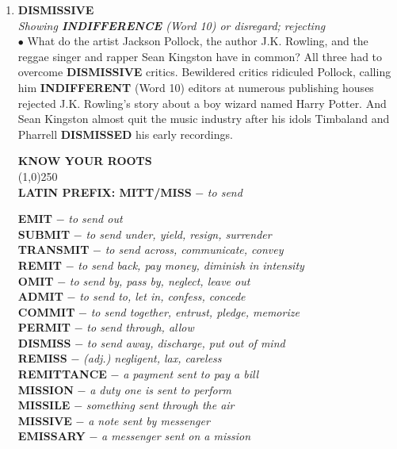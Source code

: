 \documentclass{book}
\begin{document}
\begin{enumerate}
 \item \textbf{DISMISSIVE}\\
 \textit{ Showing \textbf{INDIFFERENCE} (Word 10) or disregard; rejecting}\\
 
 $\bullet$ What do the artist Jackson Pollock, the author J.K. Rowling, and the reggae singer and rapper Sean Kingston have in common? All three had to overcome \textbf{DISMISSIVE} critics. Bewildered critics ridiculed Pollock, calling him  \textbf{INDIFFERENT} (Word 10) editors at numerous publishing houses rejected J.K. Rowling's story about a boy wizard named Harry Potter. And Sean Kingston almost quit the music industry after his idols Timbaland and Pharrell \textbf{DISMISSED} his early recordings. 
 
\begin{tcolorbox}
\begin{center}
 \textbf{  KNOW YOUR ROOTS}\\
\line(1,0){250}\\
\textbf{LATIN PREFIX: MITT/MISS} $ - $ \textit{ to send}\\
\end{center}
   \textbf{EMIT} $ - $ \textit{to send out}\\
    \textbf{SUBMIT} $ - $ \textit{to send under, yield, resign, surrender} \\ \textbf{TRANSMIT} $ - $ \textit{ to send across, communicate, convey}\\ \textbf{REMIT} $ - $ \textit{to send back, pay money, diminish in intensity}\\ \textbf{OMIT} $ - $ \textit{ to send by, pass by, neglect, leave out}\\ \textbf{ADMIT} $ - $ \textit{to send to, let in, confess, concede}\\ \textbf{COMMIT} $ - $ \textit{to send together, entrust, pledge, memorize}\\ \textbf{PERMIT} $ - $ \textit{ to send through, allow}\\
 \textbf{DISMISS} $ - $ \textit{to send away, discharge, put out of mind}\\ \textbf{REMISS} $ - $ \textit{ (adj.) negligent, lax, careless}\\ \textbf{REMITTANCE} $ - $ \textit{ a payment sent to pay a bill}\\ \textbf{MISSION} $ - $ \textit{ a duty one is sent to perform}\\ \textbf{MISSILE} $ - $ \textit{ something sent through the air}\\ \textbf{MISSIVE} $ - $ \textit{ a note sent by messenger}\\ \textbf{EMISSARY} $ - $ \textit{a messenger sent on a mission}
\end{tcolorbox}   
 

\end{enumerate}
\end{document}

